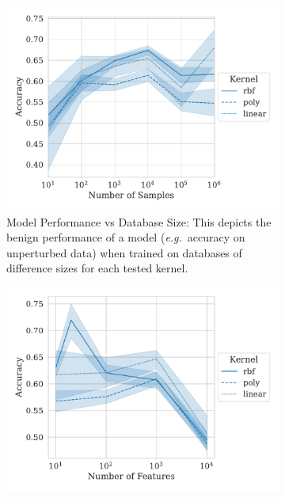 \documentclass[runningheads]{llncs}
\begin{document}
\begin{figure}
    \centering
    \begin{subfigure}{.45\textwidth}
        \centering
        \includegraphics[width=\textwidth]{./generated/accuracy_vs_samples.pdf}
        \caption{Model Performance vs Database Size: This depicts the benign performance  of a model  (\textit{e.g.}~accuracy on unperturbed data) when trained on databases of difference sizes for each tested kernel.}
        \label{fig:samples_acc}
    \end{subfigure}
    \hfill
    \begin{subfigure}{.45\textwidth}
        \centering
        \includegraphics[width=\textwidth]{./generated/accuracy_vs_features.pdf}

\end{subfigure}
\end{figure}
\end{document}
